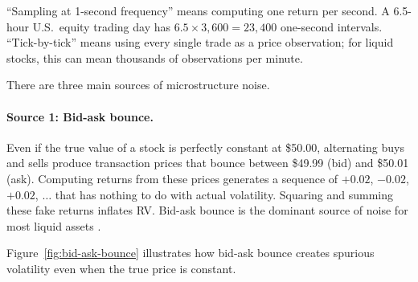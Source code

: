\begin{prereq}
``Sampling at 1-second frequency'' means computing one return per second.
A 6.5-hour U.S.\ equity trading day has $6.5 \times 3{,}600 = 23{,}400$ one-second intervals.
``Tick-by-tick'' means using every single trade as a price observation; for liquid stocks, this can mean thousands of observations per minute.
\end{prereq}

There are three main sources of microstructure noise.

\paragraph{Source 1: Bid-ask bounce.}
Even if the true value of a stock is perfectly constant at \$50.00, alternating buys and sells produce transaction prices that bounce between \$49.99 (bid) and \$50.01 (ask).
Computing returns from these prices generates a sequence of $+0.02$, $-0.02$, $+0.02$, $\ldots$ that has nothing to do with actual volatility.
Squaring and summing these fake returns inflates RV.
Bid-ask bounce is the dominant source of noise for most liquid assets \citep{HansenLunde2006}.

Figure~\ref{fig:bid-ask-bounce} illustrates how bid-ask bounce creates spurious volatility even when the true price is constant.

